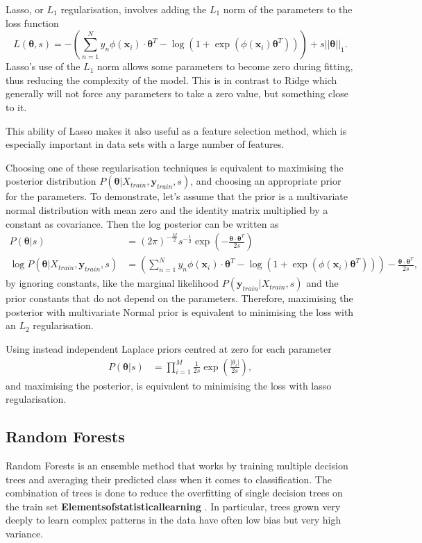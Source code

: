   Lasso, or $L_1$ regularisation, involves adding the $L_1$ norm of the parameters to the loss function
 \begin{equation}
L(\bm{\theta},s)= - \left(\sum_{n=1}^N y_n \phi\left(\mathbf{x}_{i}\right)\cdot\bm{\theta}^{T} -\log\left(1+\exp\left(\phi\left(\mathbf{x}_{i}\right)\bm{\theta}^{T}\right)\right) \right) + s||\bm{\theta}||_1.
\end{equation}
	Lasso's use of the $L_1$ norm allows some parameters to become zero during fitting, thus reducing the complexity of the model. This is in contrast to Ridge which generally will not force any parameters to take a zero value, but something close to it.
	
	This ability of Lasso makes it also useful as a feature selection method, which is especially important in data sets with a large number of features. 
	
	Choosing one of these regularisation techniques is equivalent to maximising the posterior distribution $P(\bm{\theta}|X_{train},\mathbf{y}_{train},s)$, and choosing an appropriate prior for the parameters. To demonstrate, let's assume that the prior is a multivariate normal distribution with mean zero and the identity matrix multiplied by a constant as covariance. Then the log posterior can be written as
	\begin{align}
		P(\bm{\theta}|s) &= (2\pi)^{-\frac{M}{2}}s^{-\frac{1}{2}}\exp\left(-\frac{\bm{\theta}\cdot\bm{\theta}^T}{2s}\right)\\
		\log P(\bm{\theta}|X_{train},\mathbf{y}_{train},s) &=\left(\sum_{n=1}^N y_n \phi\left(\mathbf{x}_{i}\right)\cdot\bm{\theta}^{T} -\log\left(1+\exp\left(\phi\left(\mathbf{x}_{i}\right)\bm{\theta}^{T}\right)\right) \right) - \frac{\bm{\theta}\cdot\bm{\theta}^T}{2s},
	\end{align}
  by ignoring constants, like the marginal likelihood $P(\mathbf{y}_{train}|X_{train},s)$ and the prior constants that do not depend on the parameters. Therefore, maximising the posterior with multivariate Normal prior is equivalent to minimising the loss with an $L_2$ regularisation. 
  
  
  Using instead independent Laplace priors centred at zero for each parameter
  \begin{align}
  		P(\bm{\theta}|s) &= \prod_{i = 1}^{M} \frac{1}{2s} \exp\left(\frac{|\theta_i|}{2s}\right),
  \end{align} 
  and maximising the posterior, is equivalent to minimising the loss with lasso regularisation.
\subsection{Random Forests}
Random Forests is an ensemble method that works by training multiple decision trees and averaging their predicted class when it comes to classification. The combination of trees is done to reduce the overfitting of single decision trees on the train set {\bf Elementsofstatisticallearning} . In particular, trees grown very deeply to learn complex patterns in the data have often low bias but very high variance. 

